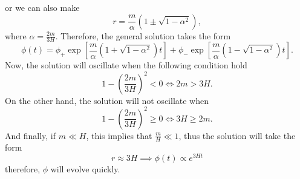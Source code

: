 \documentclass[11pt]{article}
\begin{document}
\begin{problem}
or we can also make
\begin{displaymath}
  r = \frac{m}{\alpha}(1 \pm \sqrt{1-\alpha^2}),
\end{displaymath}
where $\alpha = \frac{2m}{3H}$. Therefore, the general solution takes the form
\begin{displaymath}
  \phi(t) = \phi_{+}\exp\left[\frac{m}{\alpha}(1 + \sqrt{1-\alpha^2})t\right] + \phi_{-}\exp\left[\frac{m}{\alpha}(1 - \sqrt{1-\alpha^2})t\right].
\end{displaymath}
Now, the solution will oscillate when the following condition hold
\begin{displaymath}
  1-\left(\frac{2m}{3H}\right)^2<0 \iff 2m>3H.
\end{displaymath}
On the other hand, the solution will not oscillate when
\begin{displaymath}
  1-\left(\frac{2m}{3H}\right)^2 \geq 0 \iff 3H\geq 2m.
\end{displaymath}
And finally, if $m\ll H$, this implies that $\frac{m}{H}\ll 1$, thus the solution will take the form
\begin{displaymath}
  r\approx 3H\implies \phi(t) \propto e^{3Ht}
\end{displaymath}
therefore, $\phi$ will evolve quickly.
\end{problem}
\end{document}

